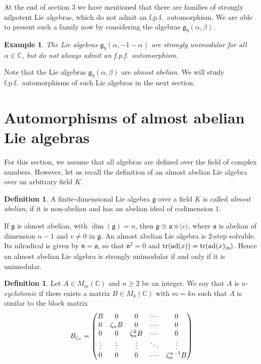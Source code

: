 \documentclass[12pt]{amsart}
\newtheorem{ex}[thm]{Example}
\theoremstyle{definition}
\newtheorem{defi}[thm]{Definition}
\theoremstyle{remark}
\newcommand{\C}{\mathbb{C}}
\newcommand{\tr}{\mathop{\rm tr}}
\newcommand{\ad}{{\rm ad}}
\newcommand{\La}{\mathfrak{a}}
\newcommand{\Lg}{\mathfrak{g}}
\newcommand{\Ln}{\mathfrak{n}}
\newcommand{\al}{\alpha}
\newcommand{\be}{\beta}
\begin{document}
At the end of section $3$ we have mentioned that there are families of strongly nilpotent Lie algebras, which do
not admit an f.p.f.\ automorphism. We are able to present such a family now by considering the algebras
$\Lg_9(\al,\be)$.

\begin{ex}\label{4.4}
The Lie algebras $\Lg_9(\al,-1-\al)$ are strongly unimodular for all  $\al \in \C$, but do not
always admit an f.p.f.\ automorphism.   
\end{ex}  

Note that the Lie algebras $\Lg_9(\al,\be)$ are {\em almost abelian}. We will study f.p.f.\ automorphisms of such
Lie algebras in the next section.

\section{Automorphisms of almost abelian Lie algebras}

For this section, we assume that all algebras are defined over the field of complex numbers.
However, let us recall the definition of an almost abelian Lie algebra over an arbitrary field $K$.

\begin{defi}
A finite-dimensional Lie algebra $\Lg$ over a field $K$ is called {\em almost abelian}, if it is
non-abelian and has an abelian ideal of codimension $1$.
\end{defi}  

If $\Lg$ is almost abelian, with $\dim(\Lg)=n$, then $\Lg\cong \La \rtimes \langle v \rangle$,
where $\La$ is abelian of dimension $n-1$ and $v\neq 0$ in $\Lg$. An almost abelian Lie algebra
is $2$-step solvable. Its nilradical is given by $\Ln=\La$, so that $\Ln^2=0$ and
$\tr (\ad(x))=\tr (\ad(x)_{\mid \Ln})$. Hence an almost abelian Lie algebra is strongly unimodular if and only
if it is unimodular.

\begin{defi}\label{5.2}
Let $A\in M_m(\C)$ and $n\ge 2$ be an integer. We say that $A$ is {\em $n$-cyclotomic} if there exists a matrix
$B\in M_k(\C)$ with $m=kn$ such that $A$ is similar to the block matrix
\[
B_{\zeta_n}=  
\begin{pmatrix}
B & 0 & 0 & \cdots & 0 \cr
0 & \zeta_n B & 0 & \cdots & 0 \cr
0 & 0 & \zeta_n^2 B & \cdots & 0 \cr
\vdots & \vdots & \vdots & \ddots & \vdots \cr
0 & 0 & 0 & \cdots & \zeta_n^{n-1}B 
\end{pmatrix}  
\]  
\end{defi}  
\end{document}
